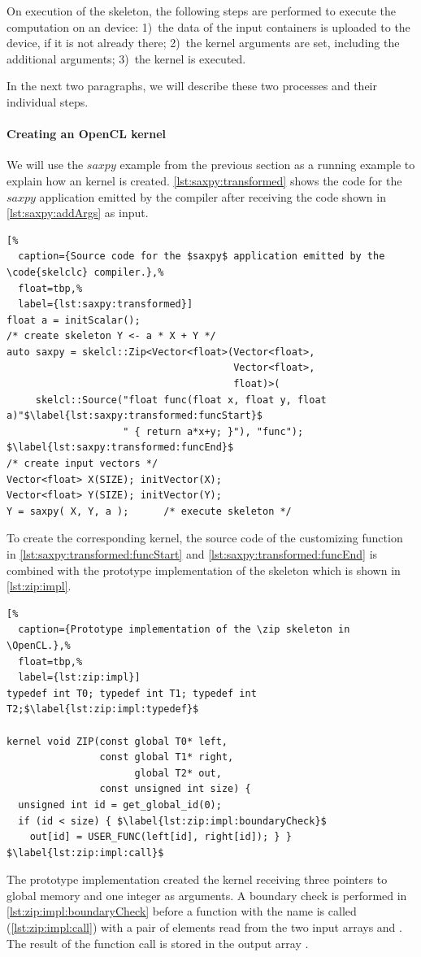 On execution of the skeleton, the following steps are performed to execute the computation on an \OpenCL device:
1)~the data of the input containers is uploaded to the \OpenCL device, if it is not already there;
2)~the \OpenCL kernel arguments are set, including the additional arguments;
3)~the \OpenCL kernel is executed.

In the next two paragraphs, we will describe these two processes and their individual steps.

\paragraph{Creating an OpenCL kernel}
We will use the $saxpy$ example from the previous section as a running example to explain how an \OpenCL kernel is created.
\autoref{lst:saxpy:transformed} shows the code for the $saxpy$ application emitted by the  compiler after receiving the code shown in \autoref{lst:saxpy:addArgs} as input.
\begin{lstlisting}[%
  caption={Source code for the $saxpy$ application emitted by the \code{skelclc} compiler.},%
  float=tbp,%
  label={lst:saxpy:transformed}]
float a = initScalar();
/* create skeleton Y <- a * X + Y */
auto saxpy = skelcl::Zip<Vector<float>(Vector<float>,
                                       Vector<float>,
                                       float)>(
     skelcl::Source("float func(float x, float y, float a)"$\label{lst:saxpy:transformed:funcStart}$
                    " { return a*x+y; }"), "func"); $\label{lst:saxpy:transformed:funcEnd}$
/* create input vectors */
Vector<float> X(SIZE); initVector(X);
Vector<float> Y(SIZE); initVector(Y);
Y = saxpy( X, Y, a );      /* execute skeleton */
\end{lstlisting}

To create the corresponding \OpenCL kernel, the source code of the customizing function in \autoref{lst:saxpy:transformed:funcStart} and \autoref{lst:saxpy:transformed:funcEnd} is combined with the prototype implementation of the \zip skeleton which is shown in \autoref{lst:zip:impl}.
%
\begin{lstlisting}[%
  caption={Prototype implementation of the \zip skeleton in \OpenCL.},%
  float=tbp,%
  label={lst:zip:impl}]
typedef int T0; typedef int T1; typedef int T2;$\label{lst:zip:impl:typedef}$

kernel void ZIP(const global T0* left,
                const global T1* right,
                      global T2* out,
                const unsigned int size) {
  unsigned int id = get_global_id(0);
  if (id < size) { $\label{lst:zip:impl:boundaryCheck}$
    out[id] = USER_FUNC(left[id], right[id]); } }  $\label{lst:zip:impl:call}$
\end{lstlisting}
%
The prototype implementation created the \OpenCL kernel  receiving three pointers to global memory and one integer as arguments.
A boundary check is performed in \autoref{lst:zip:impl:boundaryCheck} before a function with the name  is called (\autoref{lst:zip:impl:call}) with a pair of elements read from the two input arrays  and .
The result of the function call is stored in the output array .

